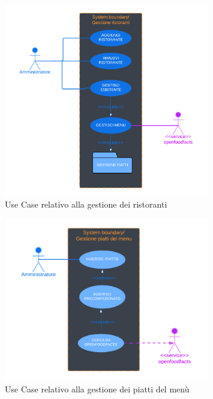         \begin{figure}[H]
            \centering
            \includegraphics[width=0.8\textwidth]{assets/diagrammi/Use-Case/Gestione ristoranti.png}
            \caption{Use Case relativo alla gestione dei ristoranti}
            \label{fig:ucdResturantMgmt}
        \end{figure}

        \begin{figure}[H]
            \centering
            \includegraphics[width=0.8\textwidth]{assets/diagrammi/Use-Case/Gestione piatti.png}
            \caption{Use Case relativo alla gestione dei piatti del menù}
            \label{fig:ucdPlatesMgmt}
        \end{figure}


